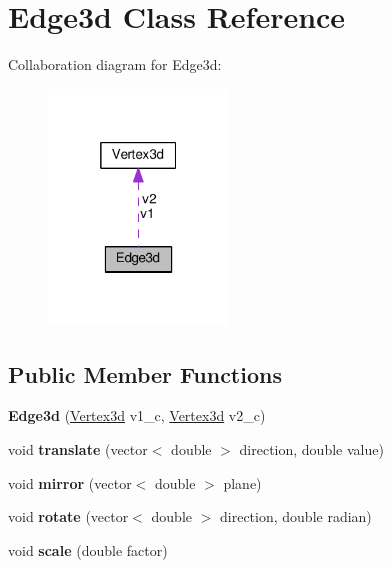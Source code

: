 \hypertarget{classEdge3d}{}\section{Edge3d Class Reference}
\label{classEdge3d}


Collaboration diagram for Edge3d\+:
\nopagebreak
\begin{figure}[H]
\begin{center}
\leavevmode
\includegraphics[width=136pt]{classEdge3d__coll__graph}
\end{center}
\end{figure}
\subsection*{Public Member Functions}
\begin{DoxyCompactItemize}
\item 
{\bfseries Edge3d} (\hyperlink{classVertex3d}{Vertex3d} v1\+\_\+c, \hyperlink{classVertex3d}{Vertex3d} v2\+\_\+c)\hypertarget{classEdge3d_aa3b092882195576dbd8279598eb9a25a}{}\label{classEdge3d_aa3b092882195576dbd8279598eb9a25a}

\item 
void {\bfseries translate} (vector$<$ double $>$ direction, double value)\hypertarget{classEdge3d_af1733ac8dae82923d56806ca15e2658a}{}\label{classEdge3d_af1733ac8dae82923d56806ca15e2658a}

\item 
void {\bfseries mirror} (vector$<$ double $>$ plane)\hypertarget{classEdge3d_a319cdf2988b30b8c04b42a984f44fbd8}{}\label{classEdge3d_a319cdf2988b30b8c04b42a984f44fbd8}

\item 
void {\bfseries rotate} (vector$<$ double $>$ direction, double radian)\hypertarget{classEdge3d_a74bc0bef90ff131c8639a47e97bd85c9}{}\label{classEdge3d_a74bc0bef90ff131c8639a47e97bd85c9}

\item 
void {\bfseries scale} (double factor)\hypertarget{classEdge3d_af27ff03f849dbeb3ac77a75ca9ba5594}{}\label{classEdge3d_af27ff03f849dbeb3ac77a75ca9ba5594}

\end{DoxyCompactItemize}
